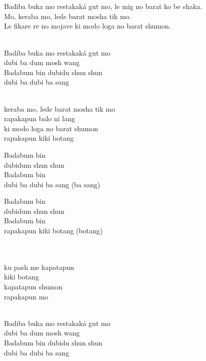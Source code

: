 \begin{lyrics}

\\

\\
Badiba buka mo restakaká gut mo, le mig no barat ko be shaka.\\
Mo, keraba mo, lede barat mosha tik mo.\\
Le fikare re no mojave ki modo loga no barat shumon.


\\
Badiba buka mo restakaká gut mo\\
dubi ba dum mosh wang\\
Badabum bin dubidu shun shun\\
dubi ba dubi ba sang

\\
keraba mo, lede barat mosha tik mo\\
rapakapun balo ni lang\\
ki modo loga no barat shumon\\
rapakapun kiki botang

Badabum bin\\
dubidum shun shun\\
Badabum bin\\
dubi ba dubi ba sang (ba sang)

Badabum bin\\
dubidum shun shun\\
Badabum bin\\
rapakapun kiki botang (botang)

\\
\\
ku pash me kapatapun\\
kiki botang\\
kapatapun shumon\\
rapakapun mo



\\
Badiba buka mo restakaká gut mo\\
dubi ba dum mosh wang\\
Badabum bin dubidu shun shun\\
dubi ba dubi ba sang


\end{lyrics}

